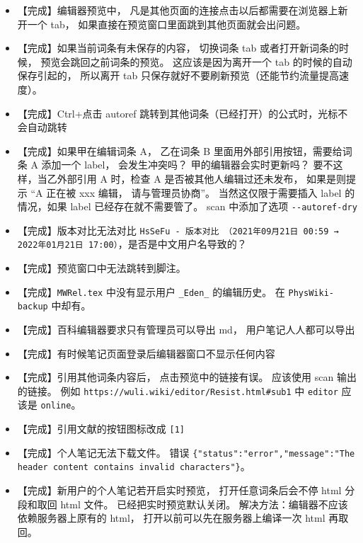 \begin{itemize}
\item 【完成】编辑器预览中， 凡是其他页面的连接点击以后都需要在浏览器上新开一个 tab， 如果直接在预览窗口里面跳到其他页面就会出问题。

\item 【完成】如果当前词条有未保存的内容， 切换词条 tab 或者打开新词条的时候， 预览会跳回之前词条的预览。 这应该是因为离开一个 tab 的时候的自动保存引起的， 所以离开 tab 只保存就好不要刷新预览（还能节约流量提高速度）。

\item 【完成】Ctrl+点击 autoref 跳转到其他词条（已经打开）的公式时，光标不会自动跳转

\item 【完成】如果甲在编辑词条 A， 乙在词条 B 里面用外部引用按钮，需要给词条 A 添加一个 label， 会发生冲突吗？ 甲的编辑器会实时更新吗？ 要不这样，当乙外部引用 A 时，检查 A 是否被其他人编辑过还未发布， 如果是则提示 “A 正在被 xxx 编辑， 请与管理员协商”。 当然这仅限于需要插入 label 的情况，如果 label 已经存在就不需要管了。 scan 中添加了选项 \verb|--autoref-dry|

\item 【完成】版本对比无法对比 \verb|HsSeFu - 版本对比 （2021年09月21日 00:59 → 2022年01月21日 17:00）|，是否是中文用户名导致的？

\item 【完成】预览窗口中无法跳转到脚注。

\item 【完成】\verb|MWRel.tex| 中没有显示用户 \verb|_Eden_| 的编辑历史。 在 \verb|PhysWiki-backup| 中却有。

\item 【完成】百科编辑器要求只有管理员可以导出 md， 用户笔记人人都可以导出

\item 【完成】有时候笔记页面登录后编辑器窗口不显示任何内容

\item 【完成】引用其他词条内容后， 点击预览中的链接有误。 应该使用 scan 输出的链接。 例如 \verb|https://wuli.wiki/editor/Resist.html#sub1| 中 \verb|editor| 应该是 \verb|online|。

\item 【完成】引用文献的按钮图标改成 \verb|[1]|

\item 【完成】个人笔记无法下载文件。 错误 \verb|{"status":"error","message":"The header content contains invalid characters"}|。

\item 【完成】新用户的个人笔记若开启实时预览， 打开任意词条后会不停 html 分段和取回 html 文件。 已经把实时预览默认关闭。 解决方法：编辑器不应该依赖服务器上原有的 html， 打开以前可以先在服务器上编译一次 html 再取回。


\end{itemize}

